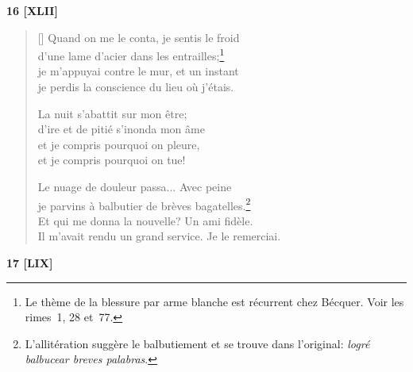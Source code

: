 \documentclass[a4paper,12pt]{book}
\begin{document}
\bigskip

\begin{center}
  \textbf{16 [XLII]}
\end{center}

\settowidth{\versewidth}{Il m'avait rendu service!... Je le remerciai.}

\begin{verse}[\versewidth]
  Quand on me le conta, je sentis le froid \\
  d'une lame d'acier dans les entrailles;\footnote{Le thème de la
  blessure par arme blanche est récurrent chez Bécquer. Voir les
  rimes~1, 28 et~77.} \\
  je m'appuyai contre le mur, et un instant \\
  je perdis la conscience du lieu où j'étais.

  La nuit s'abattit sur mon être; \\
  d'ire et de pitié s'inonda mon âme \\
  et je compris pourquoi on pleure, \\
  et je compris pourquoi on tue!

  Le nuage de douleur passa... Avec peine \\
  je parvins à balbutier de brèves bagatelles.\footnote{L'allitération
  suggère le balbutiement et se trouve dans l'original: \emph{logré
  balbucear breves palabras}.} \\
  Et qui me donna la nouvelle? Un ami fidèle. \\
  Il m'avait rendu un grand service. Je le remerciai.
\end{verse}

\bigskip

\begin{center}
  \textbf{17 [LIX]}
\end{center}

\settowidth{\versewidth}{pendant que tu éprouves tant et ne sais rien,}
\end{document}
